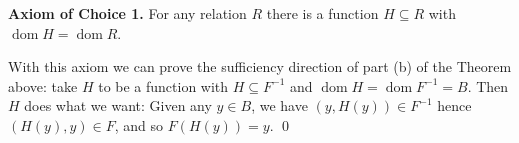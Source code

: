 \documentclass[12pt]{article}
\theoremstyle{plain}
\theoremstyle{definition}
\theoremstyle{remark}
\theoremstyle{remark}
\numberwithin{theorem}{section}
\numberwithin{equation}{section}
\newcommand{\<}{\ensuremath{\langle}}
\renewcommand{\>}{\ensuremath{\rangle}}
\newcommand{\dom}{\ensuremath{\operatorname{dom}}}   %
\begin{document}
\noindent 
{\bf Axiom of Choice 1.} For any relation $R$ there is a function
$H \subseteq R$ with $\dom H = \dom R$.

With this axiom we can prove the sufficiency direction of part (b) of the Theorem above:
take $H$ to be a function with $H \subseteq F^{-1}$ and $\dom H = \dom F^{-1} = B$. Then
$H$ does what we want: Given any $y \in B$, we have $(y,H(y)) \in F^{-1}$ hence
$(H(y), y) \in F$, and so $F(H(y)) = y$.
\qed



\printindex
\end{document}
